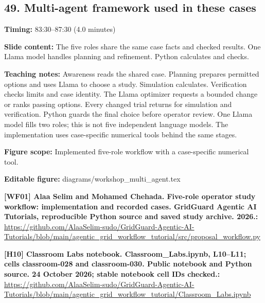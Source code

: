 \documentclass[10pt,letterpaper]{article}
\begin{document}
\subsection*{49. Multi-agent framework used in these cases}
\textbf{Timing:} 83:30--87:30 (4.0 minutes)\par
\textbf{Slide content:} The five roles share the same case facts and checked results.
One Llama model handles planning and refinement. Python calculates and checks.\par
\textbf{Teaching notes:} Awareness reads the shared case. Planning prepares permitted options and uses Llama to choose a study. Simulation calculates. Verification checks limits and case identity. The Llama optimizer requests a bounded change or ranks passing options. Every changed trial returns for simulation and verification. Python guards the final choice before operator review. One Llama model fills two roles; this is not five independent language models. The implementation uses case-specific numerical tools behind the same stages.\par
\textbf{Figure scope:} Implemented five-role workflow with a case-specific numerical tool.\par
\textbf{Editable figure:} diagrams/workshop\_multi\_agent.tex\par
\textbf{[WF01] Alaa Selim and Mohamed Chehada. Five-role operator study workflow: implementation and recorded cases. GridGuard Agentic AI Tutorials, reproducible Python source and saved study archive. 2026.:} \href{https://github.com/AlaaSelim-sudo/GridGuard-Agentic-AI-Tutorials/blob/main/agentic_grid_workflow_tutorial/src/proposal_workflow.py}{\small\ttfamily https:/\allowbreak{}/\allowbreak{}github.\allowbreak{}com/\allowbreak{}AlaaSelim-\allowbreak{}sudo/\allowbreak{}GridGuard-\allowbreak{}Agentic-\allowbreak{}AI-\allowbreak{}Tutorials/\allowbreak{}blob/\allowbreak{}main/\allowbreak{}agentic\_\allowbreak{}grid\_\allowbreak{}workflow\_\allowbreak{}tutorial/\allowbreak{}src/\allowbreak{}proposal\_\allowbreak{}workflow.\allowbreak{}py}\par
\textbf{[H10] Classroom Labs notebook. Classroom\_Labs.ipynb, L10--L11; cells classroom-028 and classroom-030. Public notebook and Python source. 24 October 2026; stable notebook cell IDs checked.:} \href{https://github.com/AlaaSelim-sudo/GridGuard-Agentic-AI-Tutorials/blob/main/agentic_grid_workflow_tutorial/Classroom_Labs.ipynb}{\small\ttfamily https:/\allowbreak{}/\allowbreak{}github.\allowbreak{}com/\allowbreak{}AlaaSelim-\allowbreak{}sudo/\allowbreak{}GridGuard-\allowbreak{}Agentic-\allowbreak{}AI-\allowbreak{}Tutorials/\allowbreak{}blob/\allowbreak{}main/\allowbreak{}agentic\_\allowbreak{}grid\_\allowbreak{}workflow\_\allowbreak{}tutorial/\allowbreak{}Classroom\_\allowbreak{}Labs.\allowbreak{}ipynb}\par
\par\medskip
\end{document}
